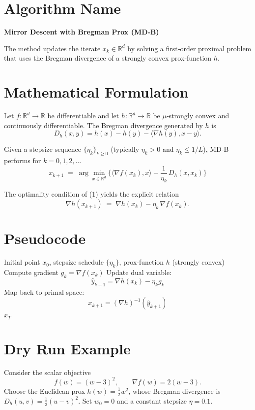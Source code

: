 \documentclass{article}
\newcommand{\inner}[2]{\langle #1,#2\rangle}
\newcommand{\D}[2]{D_{h}(#1,#2)}
\begin{document}
\section*{Algorithm Name}
\textbf{Mirror Descent with Bregman Prox (MD‑B)}  

The method updates the iterate $x_k\in\mathbb{R}^d$ by solving a
first‑order proximal problem that uses the Bregman divergence of a
strongly convex prox‑function $h$.

\section*{Mathematical Formulation}
Let $f:\mathbb{R}^d\rightarrow\mathbb{R}$ be differentiable and let  
$h:\mathbb{R}^d\rightarrow\mathbb{R}$ be $\mu$‑strongly convex and
continuously differentiable.  
The Bregman divergence generated by $h$ is  
\[
\D{x}{y}=h(x)-h(y)-\inner{\nabla h(y)}{x-y}.
\]

Given a stepsize sequence $\{\eta_k\}_{k\ge 0}$ (typically
$\eta_k>0$ and $\eta_k\le 1/L$), MD‑B performs for $k=0,1,2,\dots$
\[
\boxed{
x_{k+1}\;=\;\arg\min_{x\in\mathbb{R}^d}
\Big\{ \inner{\nabla f(x_k)}{x}+ \frac{1}{\eta_k}\,\D{x}{x_k}\Big\}
}
\tag{1}
\]

The optimality condition of (1) yields the explicit relation
\[
\nabla h(x_{k+1}) \;=\; \nabla h(x_k)-\eta_k\,\nabla f(x_k).
\tag{2}
\]

\section*{Pseudocode}
\begin{algorithm}[H]
\caption{Mirror Descent with Bregman Prox (MD‑B)}
\begin{algorithmic}[1]
\REQUIRE Initial point $x_0$, stepsize schedule $\{\eta_k\}$,
prox‑function $h$ (strongly convex)
    \STATE Compute gradient $g_k=\nabla f(x_k)$
    \STATE Update dual variable:
    \[
    \hat{y}_{k+1}= \nabla h(x_k)-\eta_k g_k
    \]
    \STATE Map back to primal space:
    \[
    x_{k+1}= (\nabla h)^{-1}(\hat{y}_{k+1})
    \]
\ENDFOR
\RETURN $x_T$
\end{algorithmic}
\end{algorithm}

\section*{Dry Run Example}
Consider the scalar objective
\[
f(w)=(w-3)^2,\qquad \nabla f(w)=2(w-3).
\]
Choose the Euclidean prox $h(w)=\tfrac12 w^{2}$, whose Bregman
divergence is $D_h(u,v)=\tfrac12 (u-v)^2$.
Set $w_0=0$ and a constant stepsize $\eta=0.1$.
\end{document}
